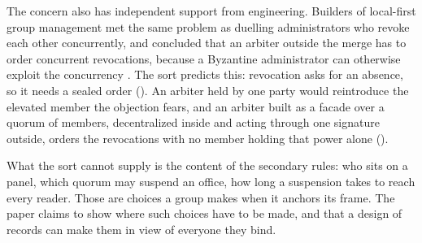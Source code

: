 The concern also has independent support from engineering. Builders of local-first group management
met the same problem as duelling administrators who revoke each other concurrently, and concluded
that an arbiter outside the merge has to order concurrent revocations, because a Byzantine
administrator can otherwise exploit the concurrency \citep{dougal2026}. The sort predicts this:
revocation asks for an absence, so it needs a sealed order (). An arbiter
held by one party would reintroduce the elevated member the objection fears, and an arbiter built as
a facade over a quorum of members, decentralized inside and acting through one signature outside,
orders the revocations with no member holding that power alone ().

What the sort cannot supply is the content of the secondary rules: who sits on a panel, which quorum
may suspend an office, how long a suspension takes to reach every reader. Those are choices a group
makes when it anchors its frame. The paper claims to show where such choices have to be made, and
that a design of records can make them in view of everyone they bind.
